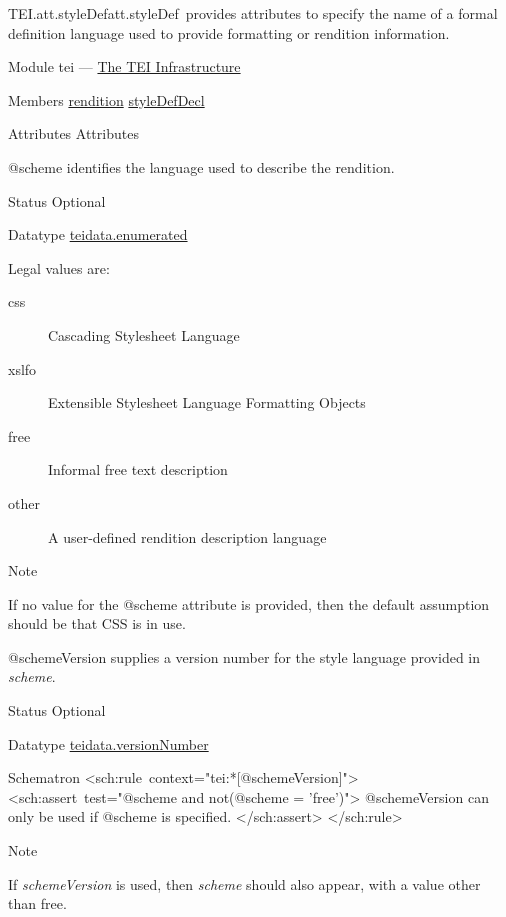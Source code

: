 \begin{reflist}
\item[]\begin{specHead}{TEI.att.styleDef}{att.styleDef} provides attributes to specify the name of a formal definition language used to provide formatting or rendition information.\end{specHead} 
    \item[{Module}]
  tei — \hyperref[ST]{The TEI Infrastructure}
    \item[{Members}]
  \hyperref[TEI.rendition]{rendition} \hyperref[TEI.styleDefDecl]{styleDefDecl}
    \item[{Attributes}]
  Attributes\hfil\\[-10pt]\begin{sansreflist}
    \item[@scheme]
  identifies the language used to describe the rendition.
\begin{reflist}
    \item[{Status}]
  Optional
    \item[{Datatype}]
  \hyperref[TEI.teidata.enumerated]{teidata.enumerated}
    \item[{Legal values are:}]
  \begin{description}

\item[{css}]Cascading Stylesheet Language
\item[{xslfo}]Extensible Stylesheet Language Formatting Objects
\item[{free}]Informal free text description
\item[{other}]A user-defined rendition description language
\end{description} 
    \item[{Note}]
  \par
If no value for the @scheme attribute is provided, then the default assumption should be that CSS is in use. 
\end{reflist}  
    \item[@schemeVersion]
  supplies a version number for the style language provided in {\itshape scheme}.
\begin{reflist}
    \item[{Status}]
  Optional
    \item[{Datatype}]
  \hyperref[TEI.teidata.versionNumber]{teidata.versionNumber}
    \item[{Schematron}]
   <sch:rule context="tei:*[@schemeVersion]"> <sch:assert test="@scheme and not(@scheme = 'free')"> @schemeVersion can only be used if @scheme is specified. </sch:assert> </sch:rule>
    \item[{Note}]
  \par
If {\itshape schemeVersion} is used, then {\itshape scheme} should also appear, with a value other than free.
\end{reflist}  
\end{sansreflist}  
\end{reflist}  
